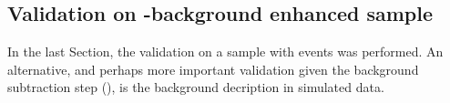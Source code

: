 \subsection{Validation on \texorpdfstring{\BB}{BB}-background enhanced sample}\label{sec:bb_background_validation}

In the last Section, the validation on a sample with \epem\ra\qqbar events was performed.
An alternative, and perhaps more important validation given the background subtraction step (),
is the \BB background decription in simulated data.
